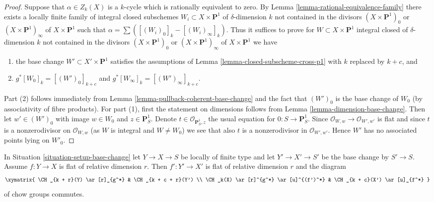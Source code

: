 \begin{proof}
Suppose that $\alpha \in Z_k(X)$ is a $k$-cycle which is rationally equivalent
to zero. By Lemma \ref{lemma-rational-equivalence-family}
there exists a locally finite family of integral closed subschemes
$W_i \subset X \times \mathbf{P}^1$ of $\delta$-dimension $k$
not contained in the divisors
$(X \times \mathbf{P}^1)_0$ or $(X \times \mathbf{P}^1)_\infty$
of $X \times \mathbf{P}^1$ such that
$\alpha = \sum ([(W_i)_0]_k - [(W_i)_\infty]_k)$.
Thus it suffices to prove for $W \subset X \times \mathbf{P}^1$
integral closed of $\delta$-dimension $k$ not contained in the divisors
$(X \times \mathbf{P}^1)_0$ or $(X \times \mathbf{P}^1)_\infty$
of $X \times \mathbf{P}^1$ we have
\begin{enumerate}
\item the base change $W' \subset X' \times \mathbf{P}^1$ satisfies the
assumptions of Lemma \ref{lemma-closed-subscheme-cross-p1} with
$k$ replaced by $k + c$, and
\item $g^*[W_0]_k = [(W')_0]_{k + c}$ and
$g^*[W_\infty]_k = [(W')_\infty]_{k + c}$.
\end{enumerate}
Part (2) follows immediately from
Lemma \ref{lemma-pullback-coherent-base-change} and the fact that
$(W')_0$ is the base change of $W_0$ (by associativity of fibre products).
For part (1), first the statement on dimensions follows
from Lemma \ref{lemma-dimension-base-change}.
Then let $w' \in (W')_0$ with image $w \in W_0$
and $z \in \mathbf{P}^1_S$. Denote $t \in \mathcal{O}_{\mathbf{P}^1_S, z}$
the usual equation for $0 : S \to \mathbf{P}^1_S$.
Since $\mathcal{O}_{W, w} \to \mathcal{O}_{W', w'}$ is flat
and since $t$ is a nonzerodivisor on $\mathcal{O}_{W, w}$
(as $W$ is integral and $W \not = W_0$) we see that also
$t$ is a nonzerodivisor in $\mathcal{O}_{W', w'}$. Hence
$W'$ has no associated points lying on $W'_0$.
\end{proof}

\begin{lemma}
\label{lemma-pullback-base-change-pullback}
In Situation \ref{situation-setup-base-change} let $Y \to X \to S$ be locally
of finite type and let $Y' \to X' \to S'$ be the base change by $S' \to S$.
Assume $f : Y \to X$ is flat of relative dimension $r$. Then $f' : Y' \to X'$
is flat of relative dimension $r$ and the diagram
$$
\xymatrix{
\CH_{k + r}(Y) \ar[r]_{g^*} & \CH_{k + c + r}(Y') \\
\CH_k(X) \ar[r]^{g^*} \ar[u]^{(f')^*} & \CH_{k + c}(X') \ar[u]_{f^*}
}
$$
of chow groups commutes.
\end{lemma}

